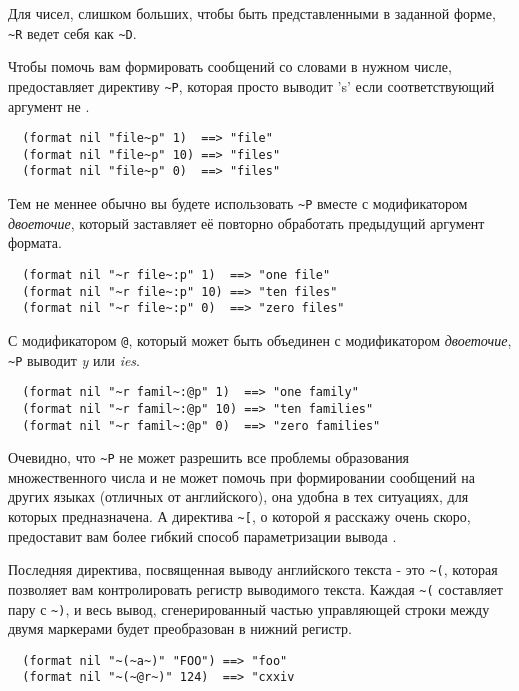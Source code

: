 {Для чисел, слишком больших, чтобы быть представленными в заданной форме, \lstinline!~R!
ведет себя как \lstinline!~D!.

Чтобы помочь вам формировать сообщений со словами в нужном числе, 
предоставляет директиву \lstinline!~P!, которая просто выводит 's' если соответствующий
аргумент не .

\begin{verbatim}
  (format nil "file~p" 1)  ==> "file"
  (format nil "file~p" 10) ==> "files"
  (format nil "file~p" 0)  ==> "files"
\end{verbatim}

Тем не меннее обычно вы будете использовать \lstinline!~P! вместе с модификатором
\textit{двоеточие}, который заставляет её повторно обработать предыдущий аргумент формата.

\begin{verbatim}
  (format nil "~r file~:p" 1)  ==> "one file"
  (format nil "~r file~:p" 10) ==> "ten files"
  (format nil "~r file~:p" 0)  ==> "zero files"
\end{verbatim}

С модификатором \lstinline!@!, который может быть объединен с модификатором
\textit{двоеточие}, \lstinline!~P! выводит \textit{y} или \textit{ies}.

\begin{verbatim}
  (format nil "~r famil~:@p" 1)  ==> "one family"
  (format nil "~r famil~:@p" 10) ==> "ten families"
  (format nil "~r famil~:@p" 0)  ==> "zero families"
\end{verbatim}

Очевидно, что \lstinline!~P! не может разрешить все проблемы образования множественного
числа и не может помочь при формировании сообщений на других языках (отличных от
английского), она удобна в тех ситуациях, для которых предназначена. А директива
\lstinline!~[!, о которой я расскажу очень скоро, предоставит вам более гибкий способ
параметризации вывода .

Последняя директива, посвященная выводу английского текста - это \lstinline!~(!, которая
позволяет вам контролировать регистр выводимого текста. Каждая \lstinline!~(! составляет
пару с \lstinline!~)!, и весь вывод, сгенерированный частью управляющей строки между двумя
маркерами будет преобразован в нижний регистр.

\begin{verbatim}
  (format nil "~(~a~)" "FOO") ==> "foo"
  (format nil "~(~@r~)" 124)  ==> "cxxiv
\end{verbatim}

}
